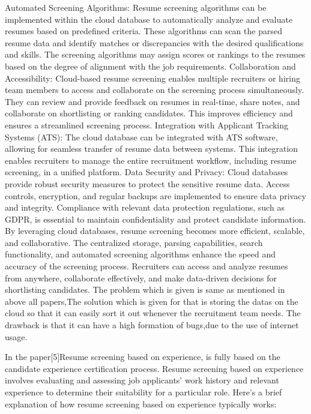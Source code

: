 \documentclass[12 pt, oneside]{book}
\begin{document}
Automated Screening Algorithms: Resume screening algorithms can be implemented within the cloud database to automatically analyze and evaluate resumes based on predefined criteria. These algorithms can scan the parsed resume data and identify matches or discrepancies with the desired qualifications and skills. The screening algorithms may assign scores or rankings to the resumes based on the degree of alignment with the job requirements.
\newline
Collaboration and Accessibility: Cloud-based resume screening enables multiple recruiters or hiring team members to access and collaborate on the screening process simultaneously. They can review and provide feedback on resumes in real-time, share notes, and collaborate on shortlisting or ranking candidates. This improves efficiency and ensures a streamlined screening process.
\newline
Integration with Applicant Tracking Systems (ATS): The cloud database can be integrated with ATS software, allowing for seamless transfer of resume data between systems. This integration enables recruiters to manage the entire recruitment workflow, including resume screening, in a unified platform.
\newline
Data Security and Privacy: Cloud databases provide robust security measures to protect the sensitive resume data. Access controls, encryption, and regular backups are implemented to ensure data privacy and integrity. Compliance with relevant data protection regulations, such as GDPR, is essential to maintain confidentiality and protect candidate information.
\newline
By leveraging cloud databases, resume screening becomes more efficient, scalable, and collaborative. The centralized storage, parsing capabilities, search functionality, and automated screening algorithms enhance the speed and accuracy of the screening process. Recruiters can access and analyze resumes from anywhere, collaborate effectively, and make data-driven decisions for shortlisting candidates.
The problem which is given is same as mentioned in above all papers,The solution which is given for that is 
storing the datas on the cloud so that it can easily sort it out whenever the recruitment team needs. The drawback is that it can have a high formation of bugs,due to the use of internet usage.
\newline
\par In the paper[5]Resume screening based on experience, is fully based on the candidate experience certification process.
Resume screening based on experience involves evaluating and assessing job applicants' work history and relevant experience to determine their suitability for a particular role. Here's a brief explanation of how resume screening based on experience typically works:
\end{document}
